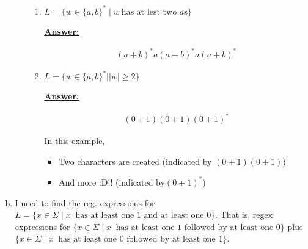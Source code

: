\documentclass[12pt]{article}
\begin{document}
\begin{enumerate}[a.]
\begin{itemize}
\begin{enumerate}[1.]
            \item $L = \{w \in \{a,b\}^* \mid w\:\text{has at lest two $a$s}\}$

            \bigskip

            \begin{mdframed}
                \underline{\textbf{Answer:}}

                \begin{align}
                (a+b)^*a(a+b)^*a(a+b)^*
                \end{align}
            \end{mdframed}

            \item $L = \{w \in \{a,b\}^* \mid \vert w \vert \geq 2\}$

            \bigskip

            \begin{mdframed}
                \underline{\textbf{Answer:}}

                \begin{align}
                (0+1)(0+1)(0+1)^*
                \end{align}

                \bigskip

                In this example,

                \bigskip

                \begin{itemize}
                    \item Two characters are created (indicated by $(0+1)(0+1)$)
                    \item And more :D!! (indicated by$(0+1)^*$)
                \end{itemize}
            \end{mdframed}
        \end{enumerate}
    \end{itemize}

    \item

    \setcounter{equation}{0}

    I need to find the reg. expressions for $L = \{x \in \Sigma \mid x\:\text{ has
    at least one 1 and at least one 0}\}$. That is, regex expressions for $\{x \in
    \Sigma \mid x\:\text{ has at least one 1 followed by at least one 0}\}$ plus
    $\{x \in \Sigma \mid x\:\text{ has at least one 0 followed by at least one 1}\}$.

    \bigskip


\end{enumerate}
\end{document}
